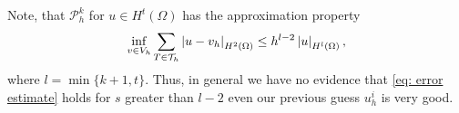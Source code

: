	Note, that $\mathcal P^k_h$ for $u \in H^t(\Omega)$ has the approximation property 
	\[
		\inf_{v \in V_h} \sum_{T \in \mathcal{T}_h} \left| u-v_h \right|_{H^2(\Omega)} \leq h^{l-2} \left| u \right|_{H^l(\Omega)},
	\]
	where $l = \min\{k+1,t\}$.
	Thus, in general we have no evidence that \eqref{eq: error estimate} holds for $s$ greater than $l-2$ even our previous guess $u_h^i$ is very good.
